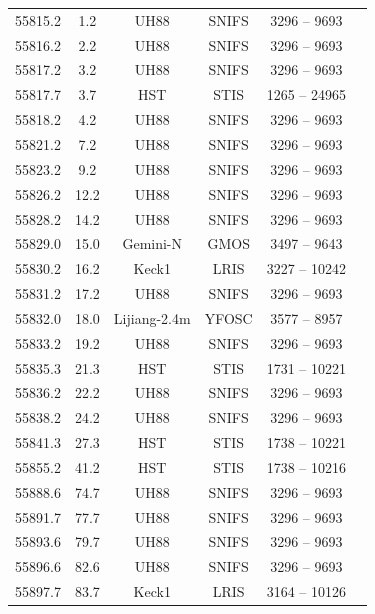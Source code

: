 \documentclass[a4paper,oneside,12pt, class=Latex/Classes/PhDthesisPSnPDF, crop=false]{standalone}
\begin{document}
\begin{longtable}{cccccc}
 55815.2 & 1.2 & UH88   & SNIFS & 3296 -- 9693 & \citet{spec_UH88} \\
 55816.2 & 2.2 & UH88   & SNIFS & 3296 -- 9693 & \citet{spec_UH88} \\
 55817.2 & 3.2 & UH88   & SNIFS & 3296 -- 9693 & \citet{spec_UH88} \\
 55817.7 & 3.7 & HST   & STIS & 1265 -- 24965 & \citet{spec_HST} \\
 55818.2 & 4.2 & UH88   & SNIFS & 3296 -- 9693 & \citet{spec_UH88} \\
 55821.2 & 7.2 & UH88   & SNIFS & 3296 -- 9693 & \citet{spec_UH88} \\
 55823.2 & 9.2 & UH88   & SNIFS & 3296 -- 9693 & \citet{spec_UH88} \\
 55826.2 & 12.2 & UH88   & SNIFS & 3296 -- 9693 & \citet{spec_UH88} \\
 55828.2 & 14.2 & UH88   & SNIFS & 3296 -- 9693 & \citet{spec_UH88} \\
 55829.0 & 15.0 & Gemini-N  & GMOS & 3497 -- 9643 & \citet{spec_Gemini-N} \\
 55830.2 & 16.2 & Keck1  & LRIS & 3227 -- 10242 & \citet{spec_Lick-3m} \\
 55831.2 & 17.2 & UH88   & SNIFS & 3296 -- 9693 & \citet{spec_UH88} \\
 55832.0 & 18.0 & Lijiang-2.4m & YFOSC & 3577 -- 8957 & \citet{spec_Lijiang-2.4m} \\
 55833.2 & 19.2 & UH88   & SNIFS & 3296 -- 9693 & \citet{spec_UH88} \\
 55835.3 & 21.3 & HST   & STIS & 1731 -- 10221 & \citet{spec_HST} \\
 55836.2 & 22.2 & UH88   & SNIFS & 3296 -- 9693 & \citet{spec_UH88} \\
 55838.2 & 24.2 & UH88   & SNIFS & 3296 -- 9693 & \citet{spec_UH88} \\
 55841.3 & 27.3 & HST   & STIS & 1738 -- 10221 & \citet{spec_HST} \\
 55855.2 & 41.2 & HST   & STIS & 1738 -- 10216 & \citet{spec_HST} \\
 55888.6 & 74.7 & UH88   & SNIFS & 3296 -- 9693 & \citet{spec_UH88} \\
 55891.7 & 77.7 & UH88   & SNIFS & 3296 -- 9693 & \citet{spec_UH88} \\
 55893.6 & 79.7 & UH88   & SNIFS & 3296 -- 9693 & \citet{spec_UH88} \\
 55896.6 & 82.6 & UH88   & SNIFS & 3296 -- 9693 & \citet{spec_UH88} \\
 55897.7 & 83.7 & Keck1  & LRIS & 3164 -- 10126 & \citet{spec_Lick-3m} \\

\end{longtable}
\end{document}
